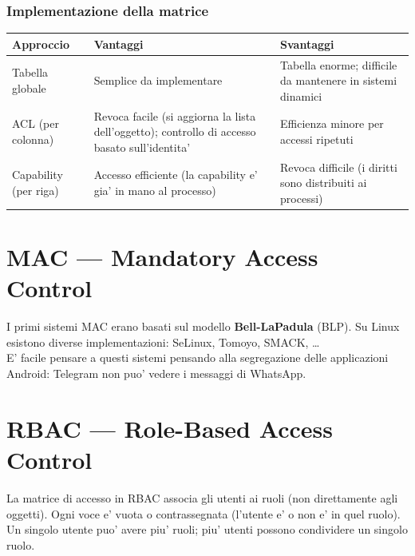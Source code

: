 \subsubsection*{Implementazione della matrice}
\begin{center}
  \footnotesize
  \begin{tabular}{|l|p{4.5cm}|p{4.5cm}|}
    \hline
    \textbf{Approccio} & \textbf{Vantaggi} & \textbf{Svantaggi} \\ \hline
    Tabella globale & Semplice da implementare & Tabella enorme; difficile da mantenere in sistemi dinamici \\ \hline
    ACL (per colonna) & Revoca facile (si aggiorna la lista dell'oggetto); controllo di accesso basato sull'identita' & Efficienza minore per accessi ripetuti \\ \hline
    Capability (per riga) & Accesso efficiente (la capability e' gia' in mano al processo) & Revoca difficile (i diritti sono distribuiti ai processi) \\ \hline
  \end{tabular}
\end{center}

\section{MAC — Mandatory Access Control}
I primi sistemi MAC erano basati sul modello \textbf{Bell-LaPadula} (BLP). Su Linux esistono diverse implementazioni: SeLinux, Tomoyo, SMACK, \dots \\
E' facile pensare a questi sistemi pensando alla segregazione delle applicazioni Android: Telegram non puo' vedere i messaggi di WhatsApp.

\section{RBAC — Role-Based Access Control}
La matrice di accesso in RBAC associa gli utenti ai ruoli (non direttamente agli oggetti). Ogni voce e' vuota o contrassegnata (l'utente e' o non e' in quel ruolo). Un singolo utente puo' avere piu' ruoli; piu' utenti possono condividere un singolo ruolo.

